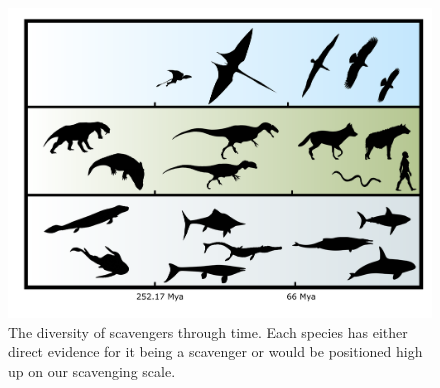\documentclass[a4paper,12pt]{article}
\begin{document}














\begin{figure}[!htbp]
\centering
   \includegraphics[width=1\textwidth]{timeline_figure/timeLine.pdf}
\caption{The diversity of scavengers through time. Each species has either direct evidence for it being a scavenger or would be positioned high up on our scavenging scale.}
\label{Timeline}
\end{figure}
\end{document}
